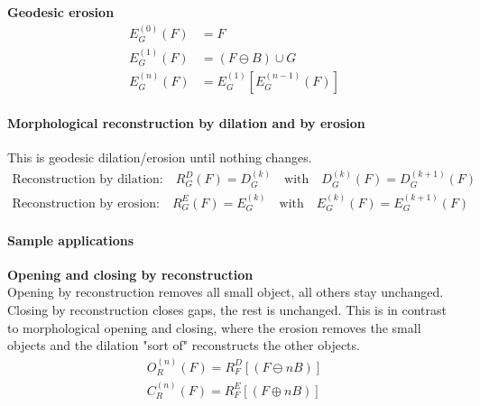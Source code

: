 \textbf{Geodesic erosion}
\begin{align*}
	E_G^{(0)}(F) &= F \\
	E_G^{(1)}(F) &= (F\ominus B)\cup G \\
	E_G^{(n)}(F) &= E_G^{(1)}[E_G^{(n-1)}(F)]
\end{align*}

\paragraph{Morphological reconstruction by dilation and by erosion}
This is geodesic dilation/erosion until nothing changes.
\begin{align*}
    \text{Reconstruction by dilation:} \quad R_G^D(F)=D_G^{(k)} \quad \text{with} \quad D_G^{(k)}(F)=D_G^{(k+1)}(F)\\
    \text{Reconstruction by erosion:} \quad R_G^E(F)=E_G^{(k)} \quad \text{with} \quad E_G^{(k)}(F)=E_G^{(k+1)}(F)
\end{align*}

\paragraph{Sample applications}
\textbf{Opening and closing by reconstruction}\\
Opening by reconstruction removes all small object, all others stay unchanged.
Closing by reconstruction closes gaps, the rest is unchanged. This is in contrast to morphological opening and closing, where the erosion removes the small objects and the dilation "sort of" reconstructs the other objects.\\
\begin{align*}
O_R^{(n)}(F)=R_F^D[(F\ominus nB)]\\
C_R^{(n)}(F)=R_F^E[(F\oplus nB)]
\end{align*}

